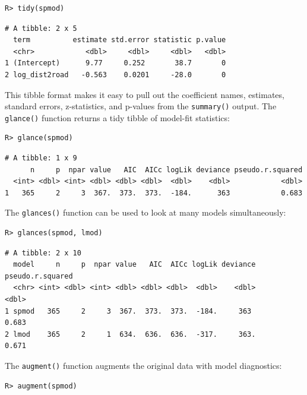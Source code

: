 \documentclass{article}
\begin{document}
\begin{verbatim}
R> tidy(spmod)
\end{verbatim}

\begin{verbatim}
# A tibble: 2 x 5
  term          estimate std.error statistic p.value
  <chr>            <dbl>     <dbl>     <dbl>   <dbl>
1 (Intercept)      9.77     0.252       38.7       0
2 log_dist2road   -0.563    0.0201     -28.0       0
\end{verbatim}

This tibble format makes it easy to pull out the coefficient names,
estimates, standard errors, z-statistics, and p-values from the
\texttt{summary()} output. The \texttt{glance()} function returns a tidy
tibble of model-fit statistics:

\begin{verbatim}
R> glance(spmod)
\end{verbatim}

\begin{verbatim}
# A tibble: 1 x 9
      n     p  npar value   AIC  AICc logLik deviance pseudo.r.squared
  <int> <dbl> <int> <dbl> <dbl> <dbl>  <dbl>    <dbl>            <dbl>
1   365     2     3  367.  373.  373.  -184.      363            0.683
\end{verbatim}

The \texttt{glances()} function can be used to look at many models
simultaneously:

\begin{verbatim}
R> glances(spmod, lmod)
\end{verbatim}

\begin{verbatim}
# A tibble: 2 x 10
  model     n     p  npar value   AIC  AICc logLik deviance pseudo.r.squared
  <chr> <int> <dbl> <int> <dbl> <dbl> <dbl>  <dbl>    <dbl>            <dbl>
1 spmod   365     2     3  367.  373.  373.  -184.     363             0.683
2 lmod    365     2     1  634.  636.  636.  -317.     363.            0.671
\end{verbatim}

The \texttt{augment()} function augments the original data with model
diagnostics:

\begin{verbatim}
R> augment(spmod)
\end{verbatim}
\end{document}
